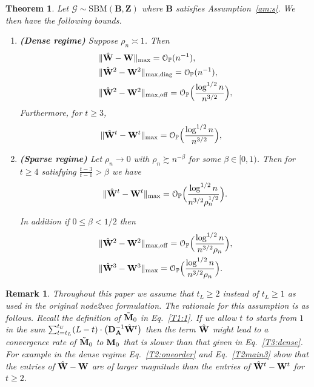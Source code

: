 \documentclass[10pt,journal,compsoc]{IEEEtran}
\newcommand{\op}{\mathcal{O}_{\mathbb{P}}}
\newcommand{\ee}{\end{aligned} \end{equation}}
\newtheorem{remark}{Remark}
\newtheorem{theorem}{Theorem}
\newcommand{\off}{\mathrm{off}}
\newcommand{\bee}{\begin{equation}\begin{aligned}}
\newcommand{\M}[1]{{{\mathbf{\MakeUppercase{#1}}}}}
\newcommand{\F}{\mathrm{F}}
\numberwithin{equation}{section}
\begin{document}
\begin{theorem}\label{T2}
Let $\mathcal{G}\sim \mathrm{SBM}(\mathbf{B},
  \mathbf{Z})$ where $\mathbf{B}$ satisfies Assumption~\ref{am:s}. We then have the following bounds.
\begin{enumerate}
\item\textbf{(Dense regime)} Suppose $\rho_n\asymp 1$. Then
\begin{align}
&\|\hat{\M W} - \M W\|_{\max} = \mathcal{O}_{\mathbb{P}}( n^{-1}), \label{T2:oneorder}
\\ &
\|\hat{\M W}^2 - {\M W}^2\|_{\max,\mathrm{diag}} = %
\mathcal{O}_{\mathbb{P}}(n^{-1}), \label{T2main30}
\\ &
\|\hat{\M W}^2 - {\M W}^2\|_{\max,\mathrm{off}} = %
 \mathcal{O}_{\mathbb{P}}\Big(\frac{\log^{1/2}{n}}{n^{3/2}}\Big), \label{T2main3}
 \end{align}
 Furthermore, for $t \geq 3$, 
\begin{align}
     &\label{T2main4}
\|\hat{\M W}^{t} - \M W^{t}\|_{\max} =
                \mathcal{O}_{\mathbb{P}}\Big(\frac{\log^{1/2}{n}}{n^{3/2}}\Big), 
\end{align}
\item\textbf{(Sparse regime)} Let $\rho_n\rightarrow 0$ with $\rho_n \succsim n^{-\beta}$ for some $\beta \in [0,1)$. Then for $t \geq 4$ satisfying $\tfrac{t-3}{t-1} > \beta$ we have
\bee\label{T5:6:main}
\|\hat{\M W}^{t} - \M W^{t}\|_{\max} =
\op\Big(\frac{\log^{1/2}{n}}{n^{3/2} \rho_n^{1/2}}\Big).
\ee
\par
In addition if $0 \leq \beta < 1/2$ then
\bee\label{T10:extend}
&\|\hat{\M W}^{2} - \M W^{2}\|_{\max,\off} = \op\Big(\frac{\log^{1/2}n}{n^{3/2} \rho_n} \Big),
\\
&\|\hat{\M W}^{3} - \M W^{3}\|_{\max} = \op\Big(\frac{\log^{1/2}n}{n^{3/2} \rho_n} \Big).
\ee
\end{enumerate}
\end{theorem}
\begin{remark}
{\upshape Throughout this paper we assume that $t_L \geq 2$ instead of
  $t_{L} \geq 1$ as used in the original node2vec formulation. The rationale for this assumption is as follows. Recall
  the definition of $\tilde{\M M}_0$ in Eq.~\eqref{T1:1}. 
 If we allow $t$ to starts from $1$ in the sum $
  \sum_{t = t_L}^{t_U}(L - t)\cdot\big(\M D_{\M A}^{-1}\hat{\M
    W}^t\big)$ then the term $\hat{\M W}$ might lead to 
  a convergence rate of $\tilde{\M M}_0$ to ${\M M}_0$ that is slower
  than that given in Eq.~\eqref{T3:dense}. For example in the dense regime Eq.~\eqref{T2:oneorder} and Eq.~\eqref{T2main3} show that the entries of $\hat{\M W} - \M W$
  are of larger magnitude than the entries of $\hat{\M W}^{t} - \M
  W^{t}$ for $t \geq 2$.}
\end{remark}
\end{document}

